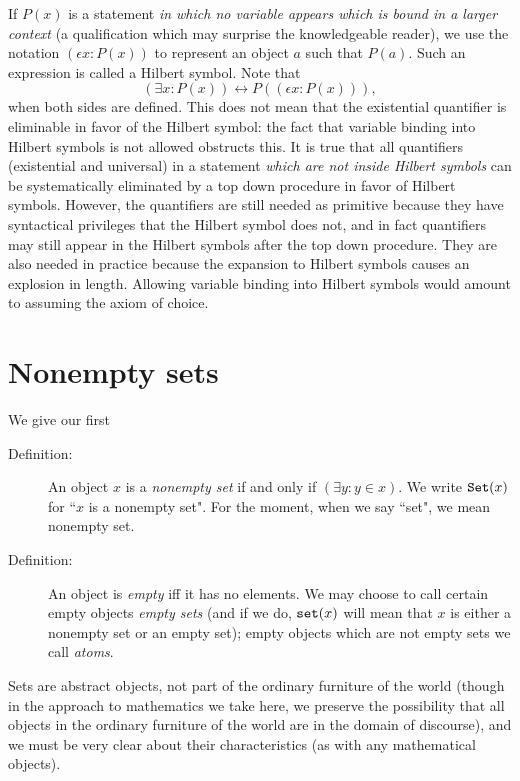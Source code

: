 \documentclass[12pt]{article}
\begin{document}
If $P(x)$ is a statement {\em in which no variable appears which is bound in a larger context\/} (a qualification which may surprise the knowledgeable reader), we use the notation $(\epsilon x:P(x))$ to represent an object $a$ such that $P(a)$.  Such an expression is called a Hilbert symbol.  Note that $$(\exists x:P(x)) \leftrightarrow P((\epsilon x:P(x))),$$  when both sides are defined.  This does not mean that the existential quantifier is eliminable in favor of the Hilbert symbol:  the fact that variable binding into Hilbert symbols is not allowed  obstructs this.  It is true that all quantifiers (existential and universal) in a statement {\em which are not inside Hilbert symbols\/} can be systematically eliminated by a top down procedure in favor of Hilbert symbols.  However, the quantifiers are still needed as primitive because they have syntactical privileges that the Hilbert symbol does not, and in fact quantifiers may still appear in the Hilbert symbols after the top down procedure. They are also needed in practice because the expansion to Hilbert symbols causes an explosion in length.  Allowing variable binding into Hilbert symbols would amount to assuming the axiom of choice.
\newpage

\section{Nonempty sets}

We give our first

\begin{description}

\item[Definition:]  An object $x$ is a {\em nonempty set\/} if and only if $(\exists y:y \in x)$.  We write ${\tt Set}(x)$ for ``$x$ is a nonempty set".  For the moment, when we say ``set",  we mean nonempty set.

\item[Definition:]  An object is {\em empty\/} iff it has no elements.  We may choose to call certain empty objects {\em empty sets\/} (and if we do, ${\tt set}(x)$ will mean that $x$ is either a nonempty set or an empty set);  empty objects which are not empty sets we call {\em atoms\/}.

\end{description}

Sets are abstract objects, not part of the ordinary furniture of the world (though in the approach to mathematics we take here, we preserve the possibility that all objects in the ordinary furniture of the world are in the domain of discourse), and we must be very clear about their characteristics (as with any mathematical objects).
\end{document}
